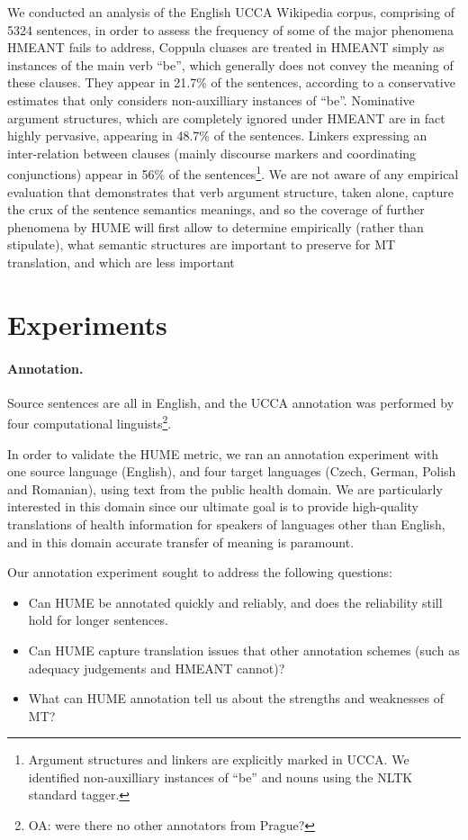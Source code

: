 \documentclass[11pt]{article}
\newcommand{\oa}[1]{\footnote{\color{red}OA: #1}}
\begin{document}
We conducted an analysis of the English UCCA Wikipedia
corpus, comprising
of 5324 sentences,
in order to assess the frequency of some of the major phenomena HMEANT fails to address,
Coppula cluases are treated in HMEANT simply as instances of the main verb ``be'', which
generally does not convey the meaning of these clauses. They appear in 21.7\% of the sentences,
according to a conservative estimates that only considers non-auxilliary instances of ``be''.
Nominative argument structures, which are completely ignored under HMEANT are in fact highly
pervasive, appearing in 48.7\% of the sentences. Linkers expressing an inter-relation between
clauses (mainly discourse markers and coordinating conjunctions) appear in 56\% of the
sentences\footnote{Argument structures and linkers are explicitly marked in UCCA. We identified
  non-auxilliary instances of ``be'' and nouns using the NLTK standard tagger.}.
We are not aware of any empirical evaluation that demonstrates that verb argument structure,
taken alone, capture the crux of the sentence semantics meanings, and so the coverage of
further phenomena by HUME will first allow to determine empirically
(rather than stipulate), what semantic structures are important
to preserve for MT translation, and which are less important




\section{Experiments}\label{sec:experiments}

\paragraph{Annotation.}
Source sentences are all in English, and the UCCA annotation was performed by four
computational linguists\oa{were there no other annotators from Prague?}.

In order to validate the HUME metric, we ran an annotation experiment with one source language (English), and four 
target languages (Czech, German, Polish and Romanian), using text from the public health domain. We are 
particularly interested in this domain since our ultimate goal is to provide high-quality translations of health
information for speakers of languages other than English, and in this domain accurate transfer of meaning is
paramount.

Our annotation experiment sought to address the following questions:
\begin{itemize}
\item Can HUME be annotated quickly and reliably, and does the reliability still hold for longer sentences.
\item Can HUME capture translation issues that other annotation schemes (such as adequacy judgements and HMEANT
cannot)?
\item What can HUME annotation tell us about the strengths and weaknesses of MT?
\end{itemize}
\end{document}
